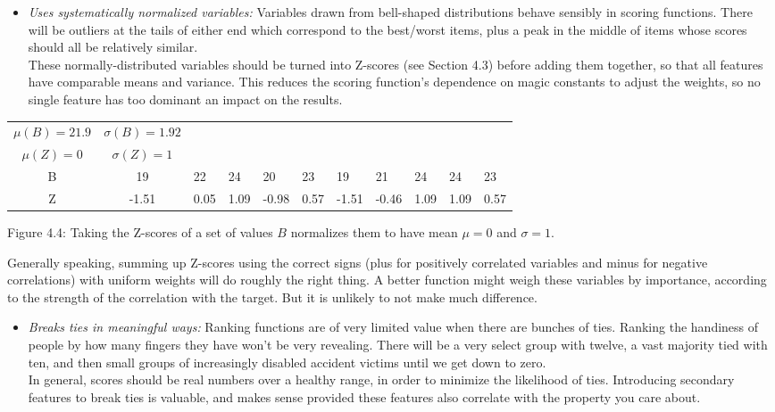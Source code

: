 \documentclass[10pt]{article}
\begin{document}
\begin{itemize}
    \item \textit{Uses systematically normalized variables:} Variables drawn from bell-shaped distributions behave sensibly in scoring functions. There will be outliers at the tails of either end which correspond to the best/worst items, plus a peak in the middle of items whose scores should all be relatively similar.\\
    These normally-distributed variables should be turned into Z-scores (see Section 4.3) before adding them together, so that all features have comparable means and variance. This reduces the scoring function's dependence on magic constants to adjust the weights, so no single feature has too dominant an impact on the results.
\end{itemize}

\begin{center}
    \begin{tabular}{|c|c|}
        \hline
        $\mu(B) = 21.9$ & $\sigma(B) = 1.92$ \\
        $\mu(Z) = 0$ & $\sigma(Z) = 1$ \\
        \hline
        B & 19 & 22 & 24 & 20 & 23 & 19 & 21 & 24 & 24 & 23 \\
        Z & -1.51 & 0.05 & 1.09 & -0.98 & 0.57 & -1.51 & -0.46 & 1.09 & 1.09 & 0.57 \\
        \hline
    \end{tabular}
\end{center}

\begin{center}
    Figure 4.4: Taking the Z-scores of a set of values $B$ normalizes them to have mean $\mu = 0$ and $\sigma = 1$.
\end{center}

Generally speaking, summing up Z-scores using the correct signs (plus for positively correlated variables and minus for negative correlations) with uniform weights will do roughly the right thing. A better function might weigh these variables by importance, according to the strength of the correlation with the target. But it is unlikely to not make much difference.

\begin{itemize}
    \item \textit{Breaks ties in meaningful ways:} Ranking functions are of very limited value when there are bunches of ties. Ranking the handiness of people by how many fingers they have won't be very revealing. There will be a very select group with twelve, a vast majority tied with ten, and then small groups of increasingly disabled accident victims until we get down to zero.\\
    In general, scores should be real numbers over a healthy range, in order to minimize the likelihood of ties. Introducing secondary features to break ties is valuable, and makes sense provided these features also correlate with the property you care about.
\end{itemize}
\end{document}
